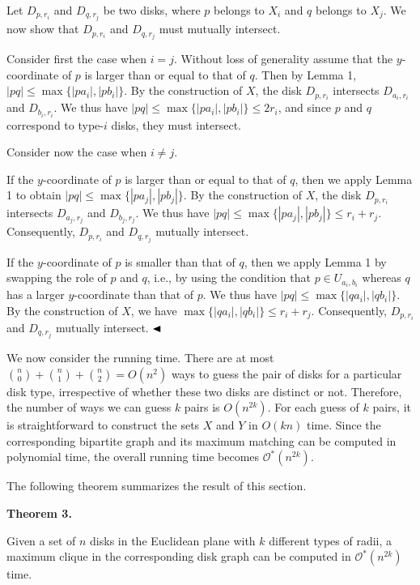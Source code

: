 \documentclass[10pt,a4paper]{amsart}
\begin{document}
Let $D_{p,r_{i}}$ and $D_{q,r_{j}}$ be two disks, where $p$ belongs to $X_{i}$ and $q$ belongs to $X_{j}$. We now show that $D_{p,r_{i}}$ and $D_{q,r_{j}}$ must mutually intersect.
\par
\par
Consider first the case when $i=j$. Without loss of generality assume that the $y$-coordinate of $p$ is larger than or equal to that of $q$. Then by Lemma 1, $|pq|\leq\max\{|pa_{i}|,|pb_{i}|\}$. By the construction of $X$, the disk $D_{p,r_{i}}$ intersects $D_{a_{i},r_{i}}$ and $D_{b_{i},r_{i}}$. We thus have $|pq|\leq\max\{|pa_{i}|,|pb_{i}|\}\leq 2r_{i}$, and since $p$ and $q$ correspond to type-$i$ disks, they must intersect.
\par
\par
Consider now the case when $i\not=j$.
\par
\par
If the $y$-coordinate of $p$ is larger than or equal to that of $q$, then we apply Lemma 1 to obtain $|pq|\leq\max\{|pa_{j}|,|pb_{j}|\}$. By the construction of $X$, the disk $D_{p,r_{i}}$ intersects $D_{a_{j},r_{j}}$ and $D_{b_{j},r_{j}}$. We thus have $|pq|\leq\max\{|pa_{j}|,|pb_{j}|\}\leq r_{i}+r_{j}$. Consequently, $D_{p,r_{i}}$ and $D_{q,r_{j}}$ mutually intersect.
\par
\par
If the $y$-coordinate of $p$ is smaller than that of $q$, then we apply Lemma 1 by swapping the role of $p$ and $q$, i.e., by using the condition that $p\in U_{a_{i},b_{i}}$ whereas $q$ has a larger $y$-coordinate than that of $p$. We thus have $|pq|\leq\max\{|qa_{i}|,|qb_{i}|\}$. By the construction of $X$, we have $\max\{|qa_{i}|,|qb_{i}|\}\leq r_{i}+r_{j}$. Consequently, $D_{p,r_{i}}$ and $D_{q,r_{j}}$ mutually intersect. $\hfill\blacktriangleleft$
\par
\par
We now consider the running time. There are at most $\binom{n}{0}+\binom{n}{1}+\binom{n}{2}=O(n^{2})$ ways to guess the pair of disks for a particular disk type, irrespective of whether these two disks are distinct or not. Therefore, the number of ways we can guess $k$ pairs is $O(n^{2k})$. For each guess of $k$ pairs, it is straightforward to construct the sets $X$ and $Y$ in $O(kn)$ time. Since the corresponding bipartite graph and its maximum matching can be computed in polynomial time, the overall running time becomes $\mathcal{O}^{*}(n^{2k})$.
\par
\par
The following theorem summarizes the result of this section.
\par
\par
\par\medskip\noindent\textbf{Theorem 3.}\par
Given a set of $n$ disks in the Euclidean plane with $k$ different types of radii, a maximum clique in the corresponding disk graph can be computed in $\mathcal{O}^{*}(n^{2k})$ time.
\par
\par
\par
\par
\end{document}
